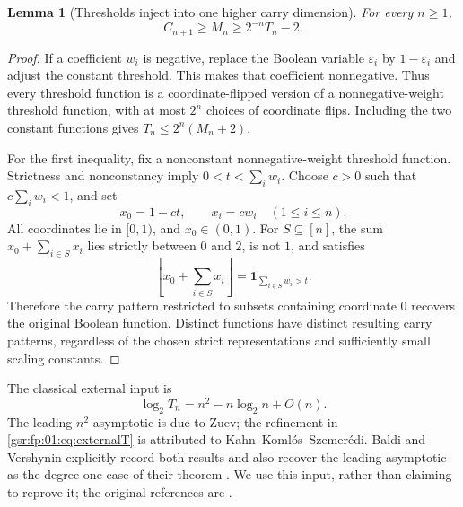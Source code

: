 \documentclass[11pt,letterpaper]{article}
\numberwithin{equation}{section}
\newtheorem{lemma}[theorem]{Lemma}
\theoremstyle{definition}
\theoremstyle{remark}
\newcommand{\one}{\mathbf 1}
\newcommand{\1}{\mathbf 1}
\newcommand{\floor}[1]{\left\lfloor#1\right\rfloor}
\begin{document}
\begin{lemma}[Thresholds inject into one higher carry dimension]
\label{gsr:fp:01:lem:thresholdembed}
For every $n\ge1$,
\begin{equation}\label{gsr:fp:01:eq:thresholdembed}
 C_{n+1}\ge M_n\ge2^{-n}T_n-2.
\end{equation}
\end{lemma}
\begin{proof}
If a coefficient $w_i$ is negative, replace the Boolean variable
$\varepsilon_i$ by $1-\varepsilon_i$ and adjust the constant threshold.
This makes that coefficient nonnegative. Thus every threshold function
is a coordinate-flipped version of a nonnegative-weight threshold
function, with at most $2^n$ choices of coordinate flips. Including the
two constant functions gives $T_n\le2^n(M_n+2)$.

For the first inequality, fix a nonconstant nonnegative-weight threshold
function. Strictness and nonconstancy imply
$0<t<\sum_iw_i$. Choose $c>0$ such that $c\sum_iw_i<1$, and set
\[
 x_0=1-ct,\qquad x_i=cw_i\quad(1\le i\le n).
\]
All coordinates lie in $[0,1)$, and $x_0\in(0,1)$. For
$S\subseteq[n]$, the sum $x_0+\sum_{i\in S}x_i$ lies strictly between
$0$ and $2$, is not $1$, and satisfies
\[
 \floor{x_0+\sum_{i\in S}x_i}
  =\one_{\sum_{i\in S}w_i>t}.
\]
Therefore the carry pattern restricted to subsets containing coordinate
$0$ recovers the original Boolean function. Distinct functions have
distinct resulting carry patterns, regardless of the chosen strict
representations and sufficiently small scaling constants.
\end{proof}

The classical external input is
\begin{equation}\label{gsr:fp:01:eq:externalT}
 \log_2T_n=n^2-n\log_2n+O(n).
\end{equation}
The leading $n^2$ asymptotic is due to Zuev; the refinement in
\eqref{gsr:fp:01:eq:externalT} is attributed to Kahn--Koml\'os--Szemer\'edi.
Baldi and Vershynin explicitly record both results and also recover the
leading asymptotic as the degree-one case of their theorem
\cite[Section 1.4 and Theorem 1.1]{bv}. We use this input, rather than
claiming to reprove it; the original references are
\cite{zuev,kks}.
\end{document}
